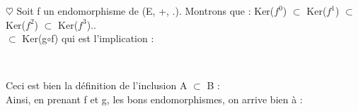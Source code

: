 \documentclass[a4paper,10pt]{article}
\begin{document}
 $\heartsuit$ Soit f un endomorphisme de (E, +, .). Montrons que : Ker($f^0$) $\subset$ Ker($f^1$) $\subset$  Ker($f^2$) $\subset$  Ker($f^3$)..\\

 $\subset$ Ker(g$\circ$f) qui est l'implication : \\

\begin{center}
\\
\end{center}
Ceci est bien la définition de l'inclusion A $\subset$ B :
\\

Ainsi, en prenant f et g, les bons endomorphismes, on arrive bien à :\\ 
\setlength{\fboxsep}{2.5 mm}
\setlength{\fboxrule}{1 mm}
\center \fbox{\textcolor{red}{Ker($f^0$) $\subset$ Ker($f^1$) $\subset$  Ker($f^2$) $\subset$  Ker($f^3$)..}}
\end{document}
